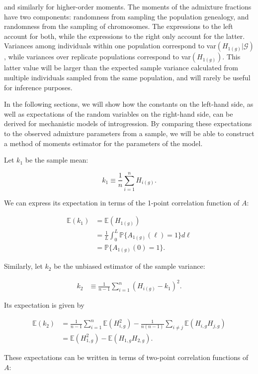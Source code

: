 \documentclass[11pt]{amsart}
\begin{document}
and similarly for higher-order moments.  The moments of the admixture fractions have two components: randomness from sampling the population genealogy, and randomness from the sampling of chromosomes.  The expressions to the left account for both, while the expressions to the right only account for the latter. Variances among individuals within one population correspond to var$(H_{1(g)}|\mathcal{G})$, while variances over replicate populations correspond to var$(H_{1(g)})$. This latter value will be larger than the expected sample variance calculated from multiple individuals sampled from the same population, and will rarely be useful for inference purposes.

In the following sections, we will show how the constants on the left-hand side, as well as expectations of the random variables on the right-hand side, can be derived for mechanistic models of introgression.
By comparing these expectations to the observed admixture parameters from a sample, we will be able to construct a method of moments estimator for the  parameters of the model. 

Let $k_1$ be the sample mean:

$$
	k_1\equiv \frac{1}{n}\sum_{i=1}^n H_{i(g)}.
$$

We can express its expectation in terms of the 1-point correlation function of $A$:

\begin{align*}
	\mathbb{E}(k_1)
	&=\mathbb{E}(H_{1(g)})\\
	&=\frac{1}{L}\int_0^L \mathbb{P}\{A_{1(g)}(\ell)=1\}d\ell\\
	&=\mathbb{P}\{A_{1(g)}(0)=1\}.
\end{align*}

Similarly, let $k_2$ be the unbiased estimator of the sample variance:

\begin{align*}
k_2&\equiv\frac{1}{n-1}\sum_{i=1}^n\left(H_{i(g)}-k_1\right)^2.
\end{align*}

Its expectation is given by

\begin{align*}
	\mathbb{E}(k_2)
	&=\frac{1}{n-1}\sum_{i=1}^n \mathbb{E}(H_{i,g}^2)-\frac{1}{n(n-1)}\sum_{i\neq j} \mathbb{E}(H_{i,g}H_{j,g})\\
	&=\mathbb{E}(H_{1,g}^2)-\mathbb{E}(H_{1,g}H_{2,g}).
\end{align*}

These expectations can be written in terms of two-point correlation functions of $A$:
\end{document}
